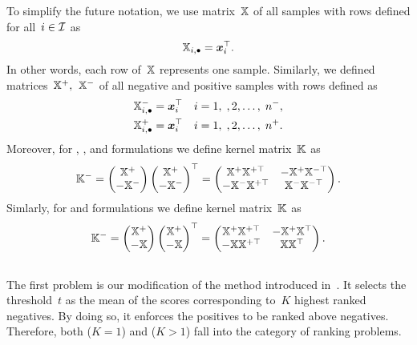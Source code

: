 \begin{notation}\label{not: kernel matrix}
  To simplify the future notation, we use matrix~$\mathbb{X}$ of all samples with rows defined for all~$i \in \mathcal{I}$ as 
  \begin{equation*}
    \mathbb{X}_{i, \bullet} = \bm{x}_i^{\top}.
  \end{equation*}
  In other words, each row of~$\mathbb{X}$ represents one sample. Similarly, we defined matrices~$\mathbb{X}^+,$~$\mathbb{X}^-$ of all negative and positive samples with rows defined as
  \begin{align*}
    \mathbb{X}^{-}_{i, \bullet} & = \bm{x}_i^{\top} \quad i = 1, \;, 2, \ldots, \; n^-, \\
    \mathbb{X}^{+}_{i, \bullet} & = \bm{x}_i^{\top} \quad i = 1, \;, 2, \ldots, \; n^+.
  \end{align*}
  Moreover, for \TopPush, \TopPushK, \tauFPL and \PatMatNP formulations we define kernel matrix~$\mathbb{K}$ as
  \begin{equation*}
    \mathbb{K}^{-} = \begin{pmatrix} \mathbb{X}^+ \\ - \mathbb{X}^- \end{pmatrix} \begin{pmatrix} \mathbb{X}^+ \\ - \mathbb{X}^- \end{pmatrix}^\top = \begin{pmatrix} \mathbb{X}^+ \mathbb{X}^{+\top} & -\mathbb{X}^+ \mathbb{X}^{-\top} \\ -\mathbb{X}^- \mathbb{X}^{+\top} & \mathbb{X}^- \mathbb{X}^{-\top}  \end{pmatrix}.
  \end{equation*}
  Simlarly, for \TopMeanK and \PatMat formulations we define kernel matrix~$\mathbb{K}$ as
  \begin{equation*}
    \mathbb{K}^{-} = \begin{pmatrix} \mathbb{X}^+ \\ - \mathbb{X} \end{pmatrix} \begin{pmatrix} \mathbb{X}^+ \\ - \mathbb{X} \end{pmatrix}^\top = \begin{pmatrix} \mathbb{X}^+ \mathbb{X}^{+\top} & -\mathbb{X}^+ \mathbb{X}^{\top} \\ -\mathbb{X} \mathbb{X}^{+\top} & \mathbb{X} \mathbb{X}^{\top}  \end{pmatrix}.
  \end{equation*}
\end{notation}

\subsection{\TopPushK}

The first problem \TopPushK is our modification of the \TopPush method introduced in~\cite{li2014top}. It selects the threshold~$t$ as the mean of the scores corresponding to~$K$ highest ranked negatives. By doing so, it enforces the positives to be ranked above negatives. Therefore, both \TopPush ($K=1$) and \TopPushK ($K>1$) fall into the category of ranking problems.

